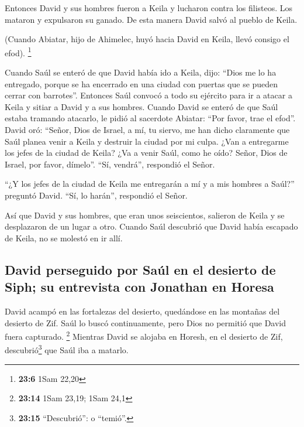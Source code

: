  Entonces David y sus hombres fueron a Keila y lucharon
contra los filisteos. Los mataron y expulsaron su ganado. De esta manera
David salvó al pueblo de Keila.

 (Cuando Abiatar, hijo de Ahimelec, huyó hacia David en
Keila, llevó consigo el efod). \footnote{\textbf{23:6} 1Sam 22,20}

 Cuando Saúl se enteró de que David había ido a Keila,
dijo: ``Dios me lo ha entregado, porque se ha encerrado en una ciudad
con puertas que se pueden cerrar con barrotes''.  Entonces
Saúl convocó a todo su ejército para ir a atacar a Keila y sitiar a
David y a sus hombres.  Cuando David se enteró de que Saúl
estaba tramando atacarlo, le pidió al sacerdote Abiatar: ``Por favor,
trae el efod''.  David oró: ``Señor, Dios de Israel, a
mí, tu siervo, me han dicho claramente que Saúl planea venir a Keila y
destruir la ciudad por mi culpa.  ¿Van a entregarme los
jefes de la ciudad de Keila? ¿Va a venir Saúl, como he oído? Señor, Dios
de Israel, por favor, dímelo''. ``Sí, vendrá'', respondió el Señor.

 ``¿Y los jefes de la ciudad de Keila me entregarán a mí
y a mis hombres a Saúl?'' preguntó David. ``Sí, lo harán'', respondió el
Señor.

 Así que David y sus hombres, que eran unos seiscientos,
salieron de Keila y se desplazaron de un lugar a otro. Cuando Saúl
descubrió que David había escapado de Keila, no se molestó en ir allí.

\hypertarget{david-perseguido-por-sauxfal-en-el-desierto-de-siph-su-entrevista-con-jonathan-en-horesa}{%
\subsection{David perseguido por Saúl en el desierto de Siph; su
entrevista con Jonathan en
Horesa}\label{david-perseguido-por-sauxfal-en-el-desierto-de-siph-su-entrevista-con-jonathan-en-horesa}}

 David acampó en las fortalezas del desierto, quedándose
en las montañas del desierto de Zif. Saúl lo buscó continuamente, pero
Dios no permitió que David fuera capturado. \footnote{\textbf{23:14}
  1Sam 23,19; 1Sam 24,1}  Mientras David se alojaba en
Horesh, en el desierto de Zif, descubrió\footnote{\textbf{23:15}
  ``Descubrió'': o ``temió''.} que Saúl iba a matarlo.

